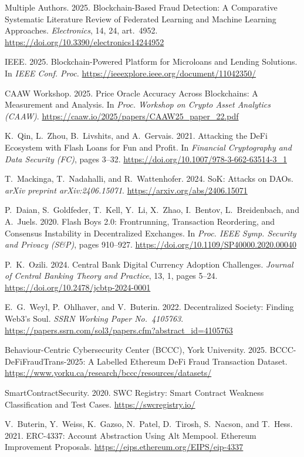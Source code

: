 \documentclass[12pt,a4paper]{report}
\begin{document}
{\begin{enumerate}[label={[\arabic*]}]
\item Multiple Authors. 2025. Blockchain-Based Fraud Detection: A Comparative Systematic Literature Review of Federated Learning and Machine Learning Approaches. \emph{Electronics}, 14, 24, art.~4952. \url{https://doi.org/10.3390/electronics14244952}

\item IEEE. 2025. Blockchain-Powered Platform for Microloans and Lending Solutions. In \emph{IEEE Conf. Proc.} \url{https://ieeexplore.ieee.org/document/11042350/}

\item CAAW Workshop. 2025. Price Oracle Accuracy Across Blockchains: A Measurement and Analysis. In \emph{Proc. Workshop on Crypto Asset Analytics (CAAW)}. \url{https://caaw.io/2025/papers/CAAW25_paper_22.pdf}

\item K.~Qin, L.~Zhou, B.~Livshits, and A.~Gervais. 2021. Attacking the DeFi Ecosystem with Flash Loans for Fun and Profit. In \emph{Financial Cryptography and Data Security (FC)}, pages 3--32. \url{https://doi.org/10.1007/978-3-662-63514-3_1}

\item T.~Mackinga, T.~Nadahalli, and R.~Wattenhofer. 2024. SoK: Attacks on DAOs. \emph{arXiv preprint arXiv:2406.15071}. \url{https://arxiv.org/abs/2406.15071}

\item P.~Daian, S.~Goldfeder, T.~Kell, Y.~Li, X.~Zhao, I.~Bentov, L.~Breidenbach, and A.~Juels. 2020. Flash Boys 2.0: Frontrunning, Transaction Reordering, and Consensus Instability in Decentralized Exchanges. In \emph{Proc. IEEE Symp. Security and Privacy (S\&P)}, pages 910--927. \url{https://doi.org/10.1109/SP40000.2020.00040}

\item P.~K.~Ozili. 2024. Central Bank Digital Currency Adoption Challenges. \emph{Journal of Central Banking Theory and Practice}, 13, 1, pages 5--24. \url{https://doi.org/10.2478/jcbtp-2024-0001}

\item E.~G.~Weyl, P.~Ohlhaver, and V.~Buterin. 2022. Decentralized Society: Finding Web3's Soul. \emph{SSRN Working Paper No.~4105763}. \url{https://papers.ssrn.com/sol3/papers.cfm?abstract_id=4105763}

\item Behaviour-Centric Cybersecurity Center (BCCC), York University. 2025. BCCC-DeFiFraudTrans-2025: A Labelled Ethereum DeFi Fraud Transaction Dataset. \url{https://www.yorku.ca/research/bccc/resources/datasets/}

\item SmartContractSecurity. 2020. SWC Registry: Smart Contract Weakness Classification and Test Cases. \url{https://swcregistry.io/}

\item V.~Buterin, Y.~Weiss, K.~Gazso, N.~Patel, D.~Tirosh, S.~Nacson, and T.~Hess. 2021. ERC-4337: Account Abstraction Using Alt Mempool. Ethereum Improvement Proposals. \url{https://eips.ethereum.org/EIPS/eip-4337}

\end{enumerate}
}
\end{document}
